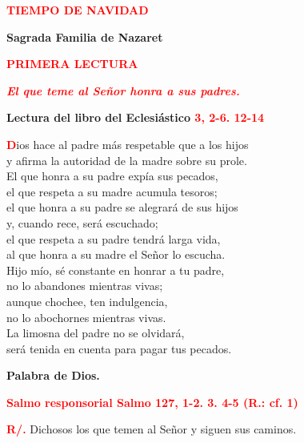 \documentclass[12pt, letterpaper]{report}
\begin{document}
\begin{center}
\Large {\bfseries \textcolor{red}{TIEMPO DE NAVIDAD}}
\end{center}

\begin{center}
\Huge {\bfseries Sagrada Familia de Nazaret}
\end{center}

\begin{center}
\Large {\bfseries \textcolor{red}{PRIMERA LECTURA}}
\end{center}

\begin{center}
\large {\bfseries \textit{ \textcolor{red}{El que teme al Se\~nor honra a sus padres.}}}
\end{center}

\Large {\bfseries Lectura del libro del Eclesi\'astico \hspace{1cm} \textcolor{red}{3, 2-6. 12-14}}

\lettrine[lines=1]{\bfseries \textcolor{red}{D}}{}\Large ios hace al padre m\'as respetable que a los hijos\\
y afirma la autoridad de la madre sobre su prole.\\
El que honra a su padre exp\'ia sus pecados,\\
el que respeta a su madre acumula tesoros;\\
el que honra a su padre se alegrar\'a de sus hijos\\
y, cuando rece, ser\'a escuchado;\\
el que respeta a su padre tendr\'a larga vida,\\
al que honra a su madre el Se\~nor lo escucha.\\
Hijo m\'io, s\'e constante en honrar a tu padre,\\
no lo abandones mientras vivas;\\
aunque chochee, ten indulgencia,\\
no lo abochornes mientras vivas.\\
La limosna del padre no se olvidar\'a,\\
ser\'a tenida en cuenta para pagar tus pecados.

{\bfseries Palabra de Dios.}

\newpage

\Large {\bfseries \textcolor{red}{Salmo responsorial \hspace{1cm} Salmo 127, 1-2. 3. 4-5 (R.: cf. 1)}}

\Large {\bfseries \textcolor{red}{R/.}} \hspace{1cm} Dichosos los que temen al Se\~nor y siguen sus caminos.
\end{document}
